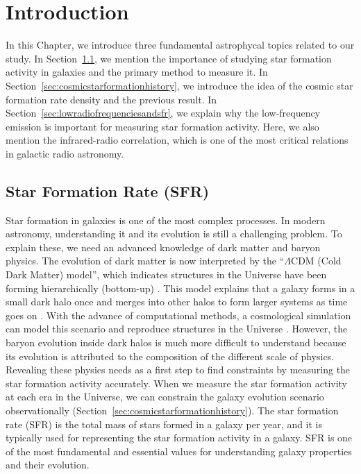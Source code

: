 \chapter{Introduction}\label{chap:introduction}
\begin{chapabstract}

In this Chapter, we introduce three fundamental astrophycal topics related to our study.
In Section~\ref{sec:starformationrate}, we mention the importance of studying star formation activity in galaxies and the primary method to measure it.
In Section~\ref{sec:cosmicstarformationhistory}, we introduce the idea of the cosmic star formation rate density and the previous result.
In Section~\ref{sec:lowradiofrequenciesandsfr}, we explain why the low-frequency emission is important for measuring star formation activity.
Here, we also mention the infrared-radio correlation, which is one of the most critical relations in galactic radio astronomy.


\end{chapabstract}

\section{Star Formation Rate (SFR)}\label{sec:starformationrate}

Star formation in galaxies is one of the most complex processes.
In modern astronomy, understanding it and its evolution is still a challenging problem.
To explain these, we need an advanced knowledge of dark matter and baryon physics.
The evolution of dark matter is now interpreted by the ``$\Lambda$CDM (Cold Dark Matter) model'', which indicates structures in the Universe have been forming hierarchically (bottom-up) \citep[e.g.,][]{Peebles1982}.
This model explains that a galaxy forms in a small dark halo once and merges into other halos to form larger systems as time goes on \citep[e.g.,][]{Blumenthal1984}.
With the advance of computational methods, a cosmological simulation can model this scenario and reproduce structures in the Universe \citep[e.g.,][]{Navarro2000, Vale2004}.
However, the baryon evolution inside dark halos is much more difficult to understand because its evolution is attributed to the composition of the different scale of physics.
Revealing these physics needs as a first step to find constraints by measuring the star formation activity accurately.
When we measure the star formation activity at each era in the Universe, we can constrain the galaxy evolution scenario observationally (Section~\ref{sec:cosmicstarformationhistory}).
The star formation rate (SFR) is the total mass of stars formed in a galaxy per year, and it is typically used for representing the star formation activity in a galaxy.
SFR is one of the most fundamental and essential values for understanding galaxy properties and their evolution.

